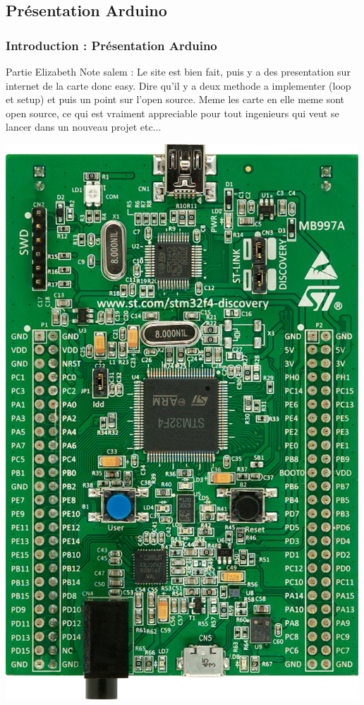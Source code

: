 \documentclass{beamer}
\begin{document}
\subsection{Présentation Arduino}
\begin{frame}
\frametitle{Introduction : Présentation Arduino}
Partie Elizabeth 
Note salem : Le site est bien fait, puis y a des presentation sur internet de la carte 
donc easy. Dire qu'il y a deux methode a implementer (loop et setup) et puis un point sur
l'open source. Meme les carte en elle meme sont open source, ce qui est vraiment appreciable
pour tout ingenieurs qui veut se lancer dans un nouveau projet etc...
\begin{center}
 \includegraphics[scale=0.1]{../images/stm32f4_discovery.jpg}
\end{center}
\end{frame}
\end{document}
